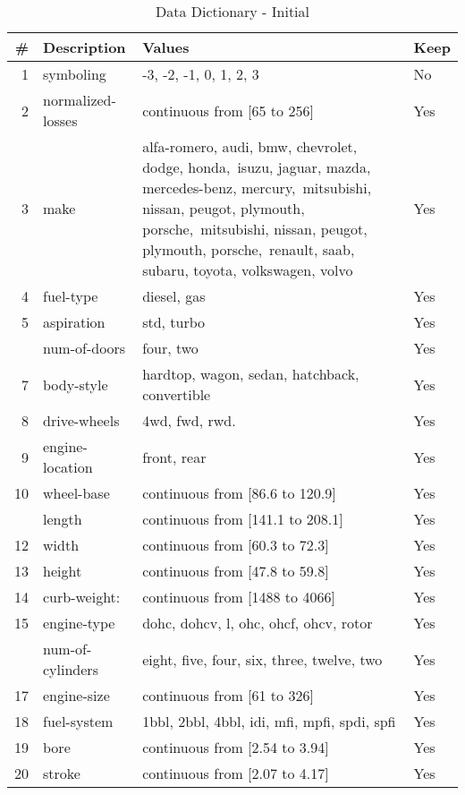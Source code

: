 \documentclass[12pt,]{book}
\theoremstyle{definition}
\theoremstyle{definition}
\theoremstyle{remark}
\begin{document}
\begin{table}

\caption{\label{tab:data-dictionary}Data Dictionary - Initial}
\centering
\begin{tabular}[t]{rlll}
\toprule
\# & Description & Values & Keep\\
\midrule
1 & symboling & -3, -2, -1, 0, 1, 2, 3 & No\\
2 & normalized-losses & continuous from [65 to 256] & Yes\\
3 & make & alfa-romero, audi, bmw, chevrolet, dodge, honda, isuzu, jaguar, mazda, mercedes-benz, mercury, mitsubishi, nissan, peugot, plymouth, porsche, mitsubishi, nissan, peugot, plymouth, porsche, renault, saab, subaru, toyota, volkswagen, volvo & Yes\\
4 & fuel-type & diesel, gas & Yes\\
5 & aspiration & std, turbo & Yes\\
\addlinespace
6 & num-of-doors & four, two & Yes\\
7 & body-style & hardtop, wagon, sedan, hatchback, convertible & Yes\\
8 & drive-wheels & 4wd, fwd, rwd. & Yes\\
9 & engine-location & front, rear & Yes\\
10 & wheel-base & continuous from [86.6 to 120.9] & Yes\\
\addlinespace
11 & length & continuous from [141.1 to 208.1] & Yes\\
12 & width & continuous from [60.3 to 72.3] & Yes\\
13 & height & continuous from [47.8 to 59.8] & Yes\\
14 & curb-weight: & continuous from [1488 to 4066] & Yes\\
15 & engine-type & dohc, dohcv, l, ohc, ohcf, ohcv, rotor & Yes\\
\addlinespace
16 & num-of-cylinders & eight, five, four, six, three, twelve, two & Yes\\
17 & engine-size & continuous from [61 to 326] & Yes\\
18 & fuel-system & 1bbl, 2bbl, 4bbl, idi, mfi, mpfi, spdi, spfi & Yes\\
19 & bore & continuous from [2.54 to 3.94] & Yes\\
20 & stroke & continuous from [2.07 to 4.17] & Yes\\
\bottomrule
\end{tabular}
\end{table}
\end{document}
